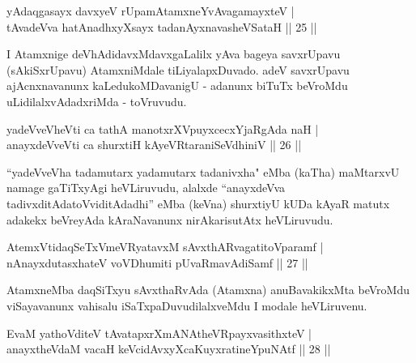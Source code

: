
\begin{shl}
yAdaqgasayx davxyeV rUpamAtamxneYvAvagamayxteV  | \\
tAvadeVva hatAnadhxyXsayx tadanAyxnavasheVSataH \hfill||  25 ||  
\end{shl}

\begin{artha}
I Atamxnige deVhAdidavxMdavxgaLalilx yAva bageya savxrUpavu (sAkiSxrUpavu) AtamxniMdale tiLiyalapxDuvado. adeV savxrUpavu ajAcnxnavanunx kaLedukoMDavanigU - adanunx biTuTx beVroMdu uLidilalxvAdadxriMda - toVruvudu.
\end{artha}


\begin{shl}
yadeVveVheVti ca tathA manotxrXV\s puyxcecxYjaRgAda naH  | \\
anayxdeVveVti ca shurxtiH kAyeVRtaraniSeVdhiniV \hfill||  26 || 
\end{shl}

\begin{artha}
``yadeVveVha tadamutarx yadamutarx tadanivxha" eMba (kaTha) maMtarxvU namage gaTiTxyAgi heVLiruvudu, alalxde ``anayxdeVva tadivxditAdatoV\s viditAdadhi'' eMba (keVna) shurxtiyU kUDa kAyaR matutx adakekx beVreyAda kAraNavanunx nirAkarisutAtx heVLiruvudu.
\end{artha}


\begin{shl}
AtemxVtidaqSeTxVmeVRyatavxM sAvxthARvagatitoV\s paramf  | \\
nAnayxdutasxhateV voVDhumiti pUvaRmavAdiSamf \hfill||  27 ||  
\end{shl}

\begin{artha}
AtamxneMba daqSiTxyu sAvxthaRvAda (Atamxna) anuBavakikxMta beVroMdu viSayavanunx vahisalu iSaTxpaDuvudilalxveMdu I modale heVLiruvenu.
\end{artha}



\begin{shl}
EvaM yathoVditeV tAvatapxrXmANAtheVR\s payxvasithxteV  | \\
anayxtheVdaM vacaH keVcidAvxyXcaKuyxratineYpuNAtf \hfill||  28 ||  
\end{shl}

